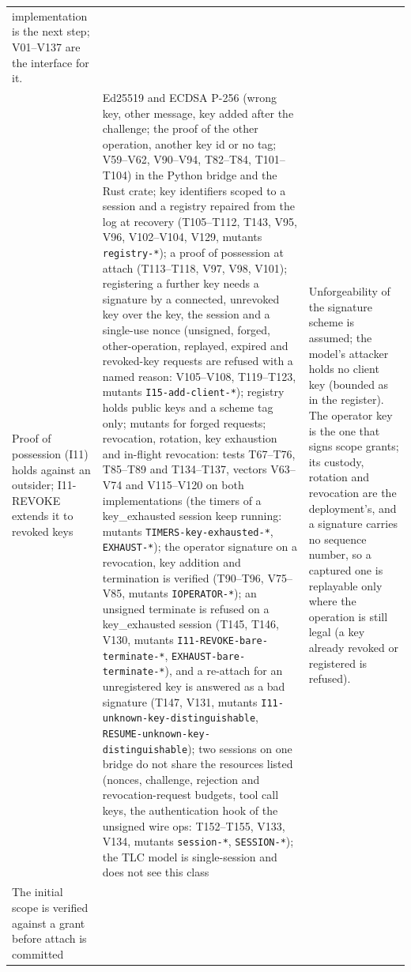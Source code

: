 \begin{table}[htbp]
\begin{tabularx}{\columnwidth}{X X X}
implementation is the next step; V01--V137 are the interface for it. \\
Proof of possession (I11) holds against an outsider; I11-REVOKE
extends it to revoked keys &
Ed25519 and ECDSA P-256 (wrong key, other message, key added after the
challenge; the proof of the other operation, another key id or no tag;
V59--V62, V90--V94, T82--T84, T101--T104) in the Python bridge and the Rust crate;
key identifiers scoped to a session and a registry repaired from the log at recovery (T105--T112, T143, V95, V96, V102--V104, V129, mutants \texttt{registry-*}); a proof of possession at attach (T113--T118, V97, V98, V101);
registering a further key needs a signature by a connected, unrevoked key over the key, the session and a single-use nonce (unsigned, forged, other-operation, replayed, expired and revoked-key requests are refused with a named reason: V105--V108, T119--T123, mutants \texttt{I15-add-client-*});
registry holds public keys and a scheme tag only; mutants for forged requests; revocation, rotation, key exhaustion and in-flight revocation: tests T67--T76, T85--T89 and T134--T137, vectors V63--V74 and V115--V120 on both implementations (the timers of a key\_exhausted session keep running: mutants \texttt{TIMERS-key-exhausted-*}, \texttt{EXHAUST-*}); the operator signature on a revocation, key addition and termination is verified (T90--T96, V75--V85, mutants \texttt{IOPERATOR-*}); an unsigned terminate is refused on a key\_exhausted session (T145, T146, V130, mutants \texttt{I11-REVOKE-bare-terminate-*}, \texttt{EXHAUST-bare-terminate-*}), and a re-attach for an unregistered key is answered as a bad signature (T147, V131, mutants \texttt{I11-unknown-key-distinguishable}, \texttt{RESUME-unknown-key-distinguishable});
two sessions on one bridge do not share the resources listed (nonces, challenge, rejection and revocation-request budgets, tool call keys, the authentication hook of the unsigned wire ops: T152--T155, V133, V134, mutants \texttt{session-*}, \texttt{SESSION-*}); the TLC model is single-session and does not see this class &
Unforgeability of the signature scheme is assumed; the model's attacker holds no
client key (bounded as in the register). The operator key is the one that signs scope grants; its
custody, rotation and revocation are the deployment's, and a signature
carries no sequence number, so a captured one is replayable only where
the operation is still legal (a key already revoked or registered is
refused). \\
The initial scope is verified against a grant before attach is committed &

\end{tabularx}
\end{table}
